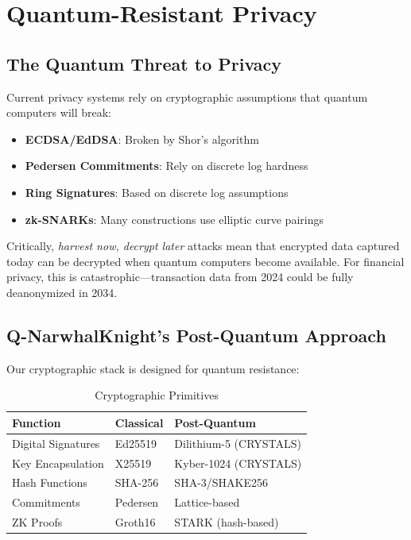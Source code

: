 \documentclass[11pt,a4paper]{article}
\begin{document}
\section{Quantum-Resistant Privacy}

\subsection{The Quantum Threat to Privacy}

Current privacy systems rely on cryptographic assumptions that quantum computers will break:

\begin{itemize}[leftmargin=*]
    \item \textbf{ECDSA/EdDSA}: Broken by Shor's algorithm
    \item \textbf{Pedersen Commitments}: Rely on discrete log hardness
    \item \textbf{Ring Signatures}: Based on discrete log assumptions
    \item \textbf{zk-SNARKs}: Many constructions use elliptic curve pairings
\end{itemize}

Critically, \textit{harvest now, decrypt later} attacks mean that encrypted data captured today can be decrypted when quantum computers become available. For financial privacy, this is catastrophic---transaction data from 2024 could be fully deanonymized in 2034.

\subsection{Q-NarwhalKnight's Post-Quantum Approach}

Our cryptographic stack is designed for quantum resistance:

\begin{table}[H]
\centering
\caption{Cryptographic Primitives}
\label{tab:crypto}
\begin{tabular}{@{}lll@{}}
\toprule
\textbf{Function} & \textbf{Classical} & \textbf{Post-Quantum} \\
\midrule
Digital Signatures & Ed25519 & Dilithium-5 (CRYSTALS) \\
Key Encapsulation & X25519 & Kyber-1024 (CRYSTALS) \\
Hash Functions & SHA-256 & SHA-3/SHAKE256 \\
Commitments & Pedersen & Lattice-based \\
ZK Proofs & Groth16 & STARK (hash-based) \\
\bottomrule
\end{tabular}
\end{table}
\end{document}
